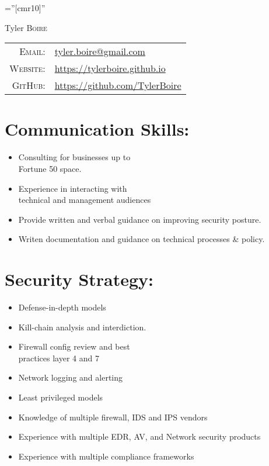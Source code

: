 \documentclass[a4paper,10pt]{article}
\begin{document}
\pagestyle{empty} 		%

\font\fb=''[cmr10]'' 	%

{\Huge Tyler \textsc{Boire}}


\begin{tabular}{rl}
    \textsc{Email:}   & \href{mailto:tyler.boire@gmail.com}{tyler.boire@gmail.com}\\
    \textsc{Website:} & \href{https://tylerboire.github.io}{https://tylerboire.github.io}\\
    \textsc{GitHub:}  & \href{https://github.com/TylerBoire}{https://github.com/TylerBoire}
\end{tabular}



\begin{multicols}{2}

\section{Communication Skills:}

\begin{itemize}[leftmargin=*]
    \item Consulting for businesses up to \\ Fortune 50 space. 
    \item Experience in interacting with \\ technical and management audiences
    \item Provide written and verbal guidance on improving security posture.
    \item Writen documentation and guidance on technical processes \& policy. 
\end{itemize}

\section{Security Strategy: }
\begin{itemize}[leftmargin=*]
    \item Defense-in-depth models
    \item Kill-chain analysis and interdiction. 
    \item Firewall config review and best \\ practices layer 4 and 7
    \item Network logging and alerting
    \item Least privileged models
    \item Knowledge of multiple firewall, IDS and IPS vendors
    \item Experience with multiple EDR, AV, and Network security products
    \item Experience with multiple compliance frameworks
\end{itemize}


\end{multicols}
\end{document}
